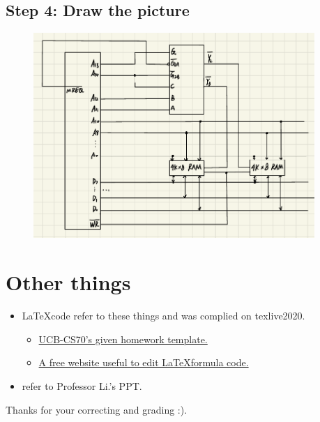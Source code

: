 \documentclass[11pt]{article}  %
\begin{document}
\subsection*{Step 4: Draw the picture}

\begin{figure}[H]
    \centering
    \includegraphics[width = 0.95\textwidth]{pic/1.pdf}
\end{figure}


\section*{Other things}

\begin{itemize}
    \item \LaTeX \space code refer to these things and was complied on texlive2020. 
    \begin{itemize}
        \item  \href{https://www.eecs70.org/assets/misc/homework_template.tex}{UCB-CS70's given homework template.} 
        \item  \href{https://www.latexlive.com}{A free website useful to edit \LaTeX \space formula code.}
    \end{itemize}
    \item refer to Professor Li.'s PPT.
\end{itemize}

    Thanks for your correcting and grading :).
\end{document}
